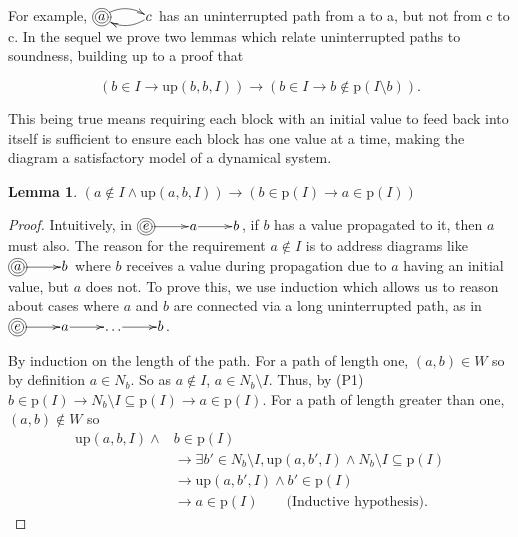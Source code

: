 \documentclass[twocolumn]{article}
\newtheorem{lemma}{Lemma}
\newcommand*{\Inputs}[1]{N_{#1}}
\begin{document}
For example, $\xymatrix@1{*++++[o][F=]{a} \ar@/^/[r] & c \ar@/^/[l]}$ has an uninterrupted path from a to a, but not from c to c. In the sequel we prove two lemmas which relate uninterrupted paths to soundness, building up to a proof that

\[
(b\in I \rightarrow \text{up}(b, b, I))
\rightarrow (b\in I\rightarrow b\not\in\text{p}(I\setminus b)).
\]

This being true means requiring each block with an initial value to feed back into itself is sufficient to ensure each block has one value at a time, making the diagram a satisfactory model of a dynamical system.

\begin{lemma} \label{lem:upp}
  $(a \not\in I \land \text{up}(a, b, I)) \rightarrow (b\in\text{p}(I) \rightarrow a\in\text{p}(I))$
\end{lemma}
\begin{proof}
    Intuitively, in $\xymatrix@1{*++++[o][F=]{e} \ar[r] & a \ar[r] & b}$, if $b$ has a value propagated to it, then $a$ must also. The reason for the requirement $a\not\in I$ is to address diagrams like $\xymatrix@1{*++++[o][F=]{a} \ar[r] & b}$ where $b$ receives a value during propagation due to $a$ having an initial value, but $a$ does not. To prove this, we use induction which allows us to reason about cases where $a$ and $b$ are connected via a long uninterrupted path, as in $\xymatrix@1{*++++[o][F=]{e} \ar[r] & a \ar[r] & \dots \ar[r] & b}$.

  By induction on the length of the path. For a path of length one, $(a, b)\in W$ so by definition $a\in\Inputs{b}$. So as $a\not\in I$, $a\in\Inputs{b}\setminus I$. Thus, by (P1) $b\in\text{p}(I)\rightarrow \Inputs{b}\setminus I\subseteq\text{p}(I)\rightarrow a\in\text{p}(I)$. For a path of length greater than one, $(a, b)\not\in W$ so
  \[
  \begin{aligned}
      \text{up}(a, b, I)\land &b\in\text{p}(I)  \\
      &\rightarrow \exists b'\in\Inputs{b}\setminus I, \text{up}(a, b', I) \land \Inputs{b}\setminus I\subseteq\text{p}(I) \\
      &\rightarrow \text{up}(a, b', I) \land b'\in\text{p}(I) \\
      &\rightarrow a\in\text{p}(I) \quad\quad\text{(Inductive hypothesis).}
  \end{aligned}
  \]
\end{proof}
\end{document}
